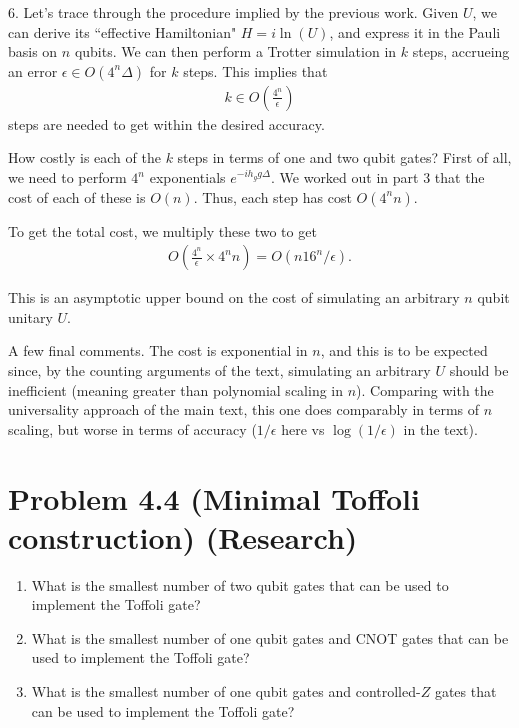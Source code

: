 \documentclass{book}
\begin{document}
    6. Let's trace through the procedure implied by the previous work. Given $U$, we can derive its ``effective Hamiltonian" $H = i \ln(U)$, and express it in the Pauli basis on $n$ qubits. We can then perform a Trotter simulation in $k$ steps, accrueing an error $\epsilon \in O(4^n \Delta)$ for $k$ steps. This implies that
    \begin{align}
        k \in O\left(\frac{4^n}{\epsilon}\right)
    \end{align}
    steps are needed to get within the desired accuracy.

    How costly is each of the $k$ steps in terms of one and two qubit gates? First of all, we need to perform $4^n$ exponentials $e^{-ih_g g \Delta}$. We worked out in part 3 that the cost of each of these is $O(n)$. Thus, each step has cost $O(4^n n)$.

    To get the total cost, we multiply these two to get
    \begin{align}
        O\left(\frac{4^n}{\epsilon} \times 4^n n\right) = O(n 16^n/ \epsilon).
    \end{align}

    This is an asymptotic upper bound on the cost of simulating an arbitrary $n$ qubit unitary $U$.

    A few final comments. The cost is exponential in $n$, and this is to be expected since, by the counting arguments of the text, simulating an arbitrary $U$ should be inefficient (meaning greater than polynomial scaling in $n$). Comparing with the universality approach of the main text, this one does comparably in terms of $n$ scaling, but worse in terms of accuracy ($1/\epsilon$ here vs $\log(1/\epsilon)$ in the text). 

\section*{Problem 4.4 (Minimal Toffoli construction) (Research)}
    \begin{enumerate}
        \item What is the smallest number of two qubit gates that can be used to implement the Toffoli gate?
        \item What is the smallest number of one qubit gates and CNOT gates that can be used to implement the Toffoli gate?
        \item What is the smallest number of one qubit gates and controlled-$Z$ gates that can be used to implement the Toffoli gate?
    \end{enumerate}
\end{document}
